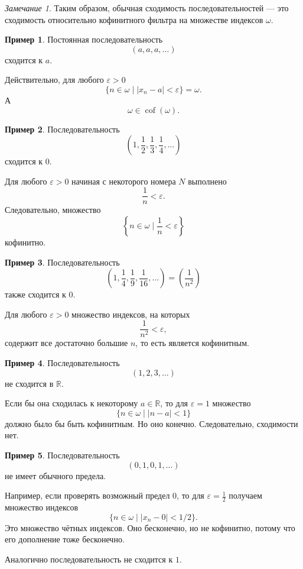 \documentclass[12pt,a4paper,oneside,openany]{book}
\theoremstyle{definition}
\newtheorem{example}{Пример}[chapter]
\theoremstyle{plain}
\theoremstyle{remark}
\newtheorem{remark}{Замечание}[chapter]
\begin{document}
\begin{remark}
Таким образом, обычная сходимость последовательностей — это сходимость относительно кофинитного фильтра на множестве индексов $\omega$.
\end{remark}

\begin{example}
Постоянная последовательность
\[
(a,a,a,\ldots)
\]
сходится к $a$.

Действительно, для любого $\varepsilon>0$
\[
\{n\in\omega\mid |x_n-a|<\varepsilon\}=\omega.
\]
А
\[
\omega\in\operatorname{cof}(\omega).
\]
\end{example}

\begin{example}
Последовательность
\[
\left(1,\frac12,\frac13,\frac14,\ldots\right)
\]
сходится к $0$.

Для любого $\varepsilon>0$ начиная с некоторого номера $N$ выполнено
\[
\frac1n<\varepsilon.
\]
Следовательно, множество
\[
\left\{n\in\omega\mid \frac1n<\varepsilon\right\}
\]
кофинитно.
\end{example}

\begin{example}
Последовательность
\[
\left(1,\frac14,\frac19,\frac1{16},\ldots\right)
=
\left(\frac1{n^2}\right)
\]
также сходится к $0$.

Для любого $\varepsilon>0$ множество индексов, на которых
\[
\frac1{n^2}<\varepsilon,
\]
содержит все достаточно большие $n$, то есть является кофинитным.
\end{example}

\begin{example}
Последовательность
\[
(1,2,3,\ldots)
\]
не сходится в $\mathbb R$.

Если бы она сходилась к некоторому $a\in\mathbb R$, то для $\varepsilon=1$ множество
\[
\{n\in\omega\mid |n-a|<1\}
\]
должно было бы быть кофинитным. Но оно конечно. Следовательно, сходимости нет.
\end{example}

\begin{example}
Последовательность
\[
(0,1,0,1,\ldots)
\]
не имеет обычного предела.

Например, если проверять возможный предел $0$, то для $\varepsilon=\frac12$ получаем множество индексов
\[
\{n\in\omega\mid |x_n-0|<1/2\}.
\]
Это множество чётных индексов. Оно бесконечно, но не кофинитно, потому что его дополнение тоже бесконечно.

Аналогично последовательность не сходится к $1$.
\end{example}
\end{document}
